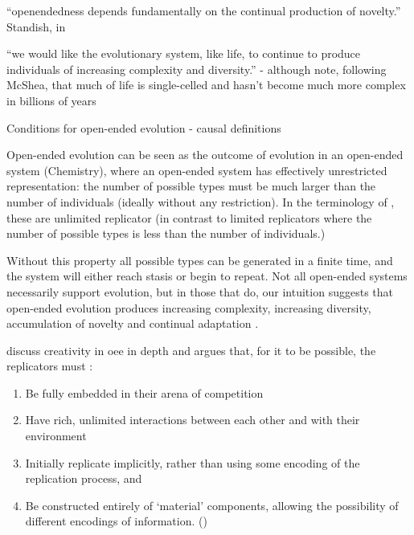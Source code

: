 ``openendedness depends fundamentally on the continual production of novelty.'' Standish, in \autocite{Soros2014}


``we would like the evolutionary system, like life, to continue to produce individuals of increasing complexity and diversity.'' -
although note, following McShea, that much of life is single-celled and hasn't become much more complex in billions of years \autocite{Maley1999}


Conditions for open-ended evolution - causal definitions

Open-ended evolution can be seen as the outcome of evolution in an open-ended system (\eg Chemistry), where an open-ended system has effectively unrestricted representation: the number of possible types must be much larger than the number of individuals (ideally without any restriction). In the terminology of \cite{Szathmary:2006ty}, these are unlimited replicator (in contrast to limited replicators where the number of possible types is less than the number of individuals.)

Without this property all possible types can be generated in a finite time, and the system will either reach stasis or begin to repeat. Not all open-ended systems necessarily support evolution, but in those that do, our intuition suggests that open-ended evolution produces increasing complexity, increasing diversity, accumulation of novelty and continual adaptation \cite{Lehman2012}.

\Textcite{Taylor2001,Taylor:1999sc} discuss creativity in \gls{oee} in depth and argues that, for it to be possible, the replicators must \parencite{Hutton2004}:
\begin{enumerate}[label=\roman*] 
	\item Be fully embedded in their arena of competition 
	\item Have rich, unlimited interactions between each other and with their environment 
	\item Initially replicate implicitly, rather than using some encoding of the replication process, and 
	\item Be constructed entirely of `material' components, allowing the possibility of different encodings of information. ()
\end{enumerate}

